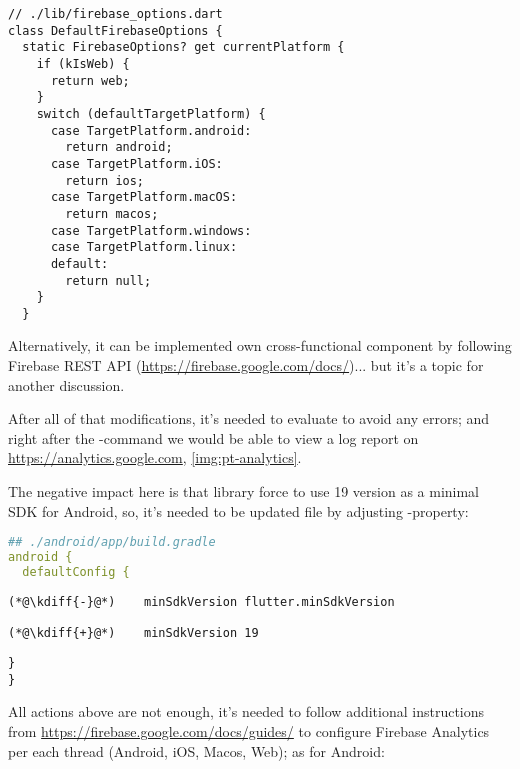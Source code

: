 \begin{lstlisting}
// ./lib/firebase_options.dart
class DefaultFirebaseOptions {
  static FirebaseOptions? get currentPlatform {
    if (kIsWeb) {
      return web;
    }
    switch (defaultTargetPlatform) {
      case TargetPlatform.android:
        return android;
      case TargetPlatform.iOS:
        return ios;
      case TargetPlatform.macOS:
        return macos;
      case TargetPlatform.windows:
      case TargetPlatform.linux:
      default:
        return null;
    }
  }
\end{lstlisting}

\noindent Alternatively, it can be implemented own cross-functional component by following Firebase REST API 
(\href{https://firebase.google.com/docs/reference/rest/database}{https://firebase.google.com/docs/})... but it's a 
topic for another discussion.

After all of that modifications, it's needed to evaluate  to avoid any errors; and right after the
-command we would be able to view a log report on 
\href{https://analytics.google.com}{https://analytics.google.com}, \cref{img:pt-analytics}.


\noindent The negative impact here is that  library force to use 19 version as a minimal SDK for 
Android, so, it's needed to be updated  file by adjusting -property:

\begin{lstlisting}[language=yaml]
## ./android/app/build.gradle
android {
  defaultConfig {
\end{lstlisting}
{
\xpretocmd{\lstlisting}{\vspace{-12pt}}{}{}
\begin{lstlisting}[firstnumber=4, backgroundcolor=\color{backred}]
(*@\kdiff{-}@*)    minSdkVersion flutter.minSdkVersion
\end{lstlisting}
\begin{lstlisting}[firstnumber=4, backgroundcolor=\color{backgreen}]
(*@\kdiff{+}@*)    minSdkVersion 19
\end{lstlisting}
\begin{lstlisting}[firstnumber=5]
  }
}
\end{lstlisting}
}

\noindent All actions above are not enough, it's needed to follow additional instructions from  
\href{https://firebase.google.com/docs/guides/}{https://firebase.google.com/docs/guides/} to configure
Firebase Analytics per each thread (Android, iOS, Macos, Web); as for Android:

